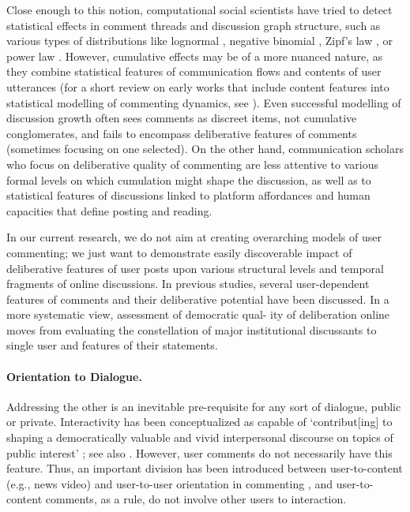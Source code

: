 Close enough to this notion, computational social scientists have tried to detect statistical effects in comment threads and discussion graph structure, such as various types of distributions like lognormal \cite{GomezKappenKaltenbrunner}, negative binomial \cite{TsagkiasWeerkampDeRijke}, Zipf’s law \cite{KumarMahdianMcGlohon}, or power law \cite{BodrunovaBlekanov}. However, cumulative effects may be of a more nuanced nature, as they combine statistical features of communication flows and contents of user utterances (for a short review on early works that include content features into statistical modelling of commenting dynamics, see \cite{WangYeHuberman}). Even successful modelling of discussion growth \cite{WangYeHuberman} often sees comments as discreet items, not cumulative conglomerates, and fails to encompass deliberative features of comments (sometimes focusing on one selected). On the other hand, communication scholars who focus on deliberative quality of commenting \cite{Rowe} are less attentive to various formal levels on which cumulation might shape the discussion, as well as to statistical features of discussions linked to platform affordances and human capacities that define posting and reading.

In our current research, we do not aim at creating overarching models of user commenting; we just want to demonstrate easily discoverable impact of deliberative features of user posts upon various structural levels and temporal fragments of online discussions. In previous studies, several user-dependent features of comments and their deliberative potential have been discussed. In a more systematic view, assessment of democratic qual- ity of deliberation online moves from evaluating the constellation of major institutional discussants to single user and features of their statements.

\paragraph{Orientation to Dialogue.} Addressing the other is an inevitable pre-requisite for any sort of dialogue, public or private. Interactivity has been conceptualized as capable of ‘contribut[ing] to shaping a democratically valuable and vivid interpersonal discourse on topics of public interest’ \cite[p.~1112]{ZiegeleBreinerQuiring}; see also \cite{BoczkowskiMitchelstein,Freelon,RuizDomingoMico}. However, user comments do not necessarily have this feature. Thus, an important division has been introduced between user-to-content (e.g., news video) and user-to-user orientation in commenting \cite{KsiazekPeerZivic}, and user-to-content comments, as a rule, do not involve other users to interaction.

